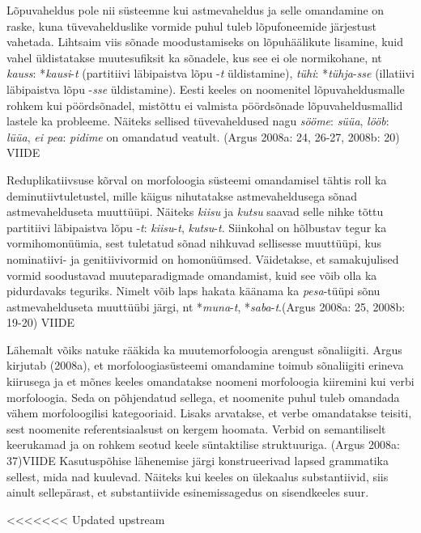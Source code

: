 \documentclass[12pt]{article}
\begin{document}
Lõpuvaheldus pole nii süsteemne kui astmevaheldus ja selle omandamine on raske, kuna tüvevahelduslike vormide puhul tuleb lõpufoneemide järjestust vahetada. Lihtsaim viis sõnade moodustamiseks on lõpuhäälikute lisamine, kuid vahel üldistatakse muutesufiksit ka sõnadele, kus see ei ole normikohane, nt \emph{kauss}: *\emph{kausi}-\emph{t} (partitiivi läbipaistva lõpu -\emph{t} üldistamine), \emph{tühi}: *\emph{tühja}-\emph{sse} (illatiivi läbipaistva lõpu -\emph{sse} üldistamine). Eesti keeles on noomenitel lõpuvaheldusmalle rohkem kui pöördsõnadel, mistõttu ei valmista pöördsõnade lõpuvaheldusmallid lastele ka probleeme. Näiteks sellised tüvevaheldused nagu \emph{sööme}: \emph{süüa}, \emph{lööb}: \emph{lüüa}, \emph{ei pea}: \emph{pidime} on omandatud veatult. (Argus 2008a: 24, 26-27, 2008b: 20) VIIDE

Reduplikatiivsuse kõrval on morfoloogia süsteemi omandamisel tähtis roll ka deminutiivtuletustel, mille käigus nihutatakse astmevaheldusega sõnad astmevahelduseta muuttüüpi. Näiteks \emph{kiisu} ja \emph{kutsu} saavad selle nihke tõttu partitiivi läbipaistva lõpu -\emph{t}: \emph{kiisu}-\emph{t}, \emph{kutsu}-\emph{t}. Siinkohal on hõlbustav tegur ka vormihomonüümia, sest tuletatud sõnad nihkuvad sellisesse muuttüüpi, kus nominatiivi- ja genitiivivormid on homonüümsed. Väidetakse, et samakujulised vormid soodustavad muuteparadigmade omandamist, kuid see võib olla ka pidurdavaks teguriks. Nimelt võib laps hakata käänama ka \emph{pesa}-tüüpi sõnu astmevahelduseta muuttüübi järgi, nt *\emph{muna}-\emph{t}, *\emph{saba}-\emph{t}.(Argus 2008a: 25, 2008b: 19-20) VIIDE

Lähemalt võiks natuke rääkida ka muutemorfoloogia arengust sõnaliigiti. Argus kirjutab (2008a), et morfoloogiasüsteemi omandamine toimub sõnaliigiti erineva kiirusega ja et mõnes keeles omandatakse noomeni morfoloogia kiiremini kui verbi morfoloogia. Seda on põhjendatud sellega, et noomenite puhul tuleb omandada vähem morfoloogilisi kategooriaid. Lisaks arvatakse, et verbe omandatakse teisiti, sest noomenite referentsiaalsust on kergem hoomata. Verbid on semantiliselt keerukamad ja on rohkem seotud keele süntaktilise struktuuriga. (Argus 2008a: 37)VIIDE Kasutuspõhise lähenemise järgi konstrueerivad lapsed grammatika sellest, mida nad kuulevad. Näiteks kui keeles on ülekaalus substantiivid, siis ainult sellepärast, et substantiivide esinemissagedus on sisendkeeles suur. 


<<<<<<< Updated upstream
\end{document}

